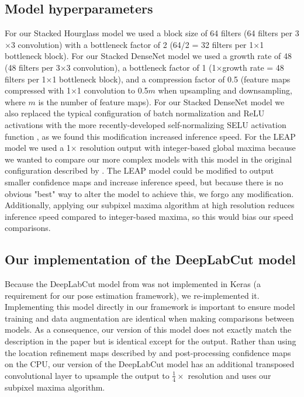 \documentclass[11pt,a4paper,oneside]{article}
\begin{document}
\begin{appendices}
\subsection{Model hyperparameters}
For our Stacked Hourglass model we used a block size of 64 filters (64 filters per 3$\times$3 convolution) with a bottleneck factor of 2 (64/2 = 32 filters per 1$\times$1 bottleneck block). For our Stacked DenseNet model we used a growth rate of 48 (48 filters per 3$\times$3 convolution), a bottleneck factor of 1 (1$\times$growth rate = 48 filters per 1$\times$1 bottleneck block), and a compression factor of 0.5 (feature maps compressed with 1$\times$1 convolution to 0.5$m$ when upsampling and downsampling, where $m$ is the number of feature maps). For our Stacked DenseNet model we also replaced the typical configuration of batch normalization and ReLU activations \citep{goodfellow2016deep} with the more recently-developed self-normalizing SELU activation function \citep{klambauer2017self}, as we found this modification increased inference speed. For the LEAP model \citep{pereira2019fast} we used a 1$\times$ resolution output with integer-based global maxima because we wanted to compare our more complex models with this model in the original configuration described by \citet{pereira2019fast}. The LEAP model could be modified to output smaller confidence maps and increase inference speed, but because there is no obvious "best" way to alter the model to achieve this, we forgo any modification. Additionally, applying our subpixel maxima algorithm at high resolution reduces inference speed compared to integer-based maxima, so this would bias our speed comparisons. 

\subsection{Our implementation of the DeepLabCut model}
Because the DeepLabCut model from \cite{mathis2018deeplabcut} was not implemented in Keras (a requirement for our pose estimation framework), we re-implemented it. Implementing this model directly in our framework is important to ensure model training and data augmentation are identical when making comparisons between models.  As a consequence, our version of this model does not exactly match the description in the paper but is identical except for the output. Rather than using the location refinement maps described by \cite{insafutdinov2016deepercut} and post-processing confidence maps on the CPU, our version of the DeepLabCut model \citep{mathis2018deeplabcut} has an additional transposed convolutional layer to upsample the output to $\frac{1}{4}\times$ resolution and uses our subpixel maxima algorithm.


\end{appendices}
\end{document}
